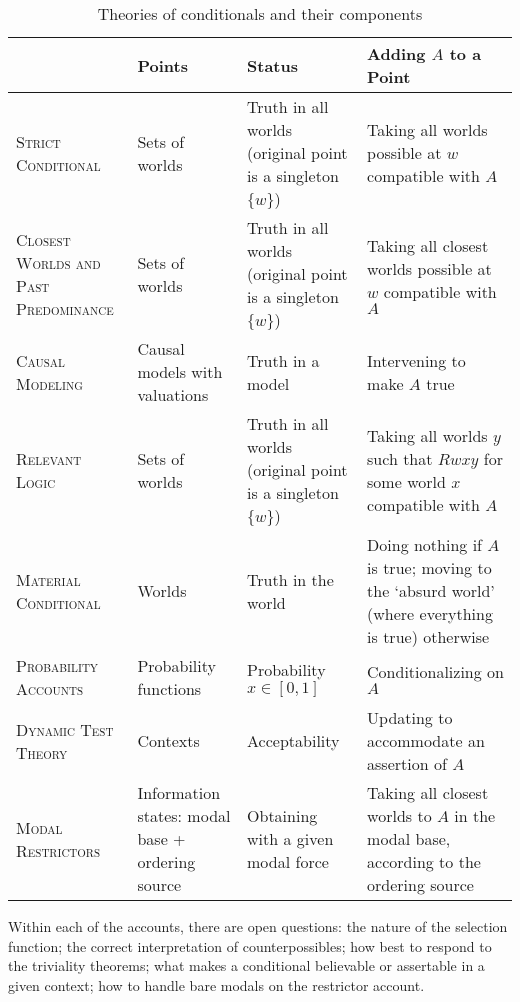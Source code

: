 \noindent
\bgroup
\def\arraystretch{1.1}
\setlength\tabcolsep{.8em}
\begin{sidewaystable}[pht!]
\centering
\begin{tabular}{p{0.19\textheight}p{0.15\textheight}p{0.25\textheight}p{0.27\textheight}}

    & Points & Status & Adding $A$ to a Point\\

\hline\hline

\textsc{Strict Conditional} &
	Sets of worlds &
	Truth in all worlds (original point is a singleton $\{w\}$) &
	Taking all worlds possible at $w$ compatible with $A$\\
\textsc{Closest Worlds and Past Predominance} &
    Sets of worlds &
	Truth in all worlds (original point is a singleton $\{w\}$) &
	Taking all closest worlds possible at $w$ compatible with $A$\\
\textsc{Causal Modeling} &
	\raggedright Causal models with valuations &
	Truth in a model &
	Intervening to make $A$ true\\
\textsc{Relevant Logic} &
	Sets of worlds &
	Truth in all worlds (original point is a singleton $\{w\}$) &
	Taking all worlds $y$ such that $Rwxy$ for some world $x$ compatible with $A$\\
\textsc{Material Conditional} &
	Worlds &
	Truth in the world &
	Doing nothing if $A$ is true; moving to the `absurd world' (where everything is true) otherwise\\
\textsc{Probability Accounts} &
    \raggedright Probability functions &
	Probability $x \in [0, 1]$ &
	Conditionalizing on $A$\\
\textsc{Dynamic Test Theory} &
	Contexts &
	Acceptability &
	Updating to accommodate an assertion of $A$\\
\textsc{Modal Restrictors} &
	Information states: modal base + ordering source &
	Obtaining with a given modal force &
	Taking all closest worlds to $A$ in the modal base, according to the ordering source\\
\end{tabular}
\caption{Theories of conditionals and their components}
\label{table:rake}
\end{sidewaystable}
\egroup

Within each of the accounts, there are open questions: the nature of the selection function; the correct interpretation of counterpossibles; how best to respond to the triviality theorems; what makes a conditional believable or assertable in a given context; how to handle bare modals on the restrictor account.

